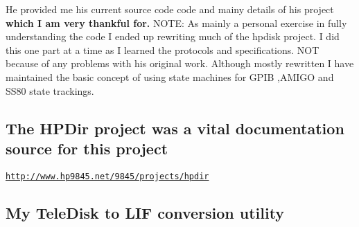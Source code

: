 He provided me his current source code code and mainy details of his project {\bfseries which I am very thankful for.} N\+O\+TE\+: As mainly a personal exercise in fully understanding the code I ended up rewriting much of the hpdisk project. I did this one part at a time as I learned the protocols and specifications. N\+OT because of any problems with his original work. Although mostly rewritten I have maintained the basic concept of using state machines for G\+P\+IB ,A\+M\+I\+GO and S\+S80 state trackings.

\subsection*{The H\+P\+Dir project was a vital documentation source for this project}


\begin{DoxyItemize}
\item \href{http://www.hp9845.net/9845/projects/hpdir}{\tt http\+://www.\+hp9845.\+net/9845/projects/hpdir}
\end{DoxyItemize}

\subsection*{My Tele\+Disk to L\+IF conversion utility}


